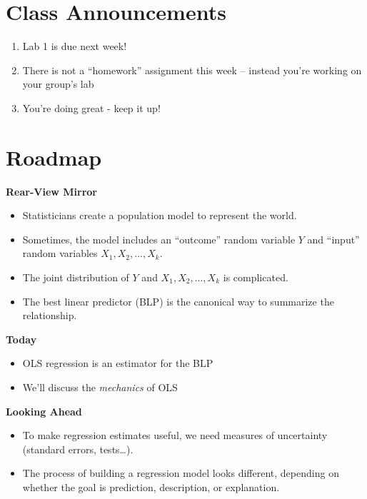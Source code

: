 \documentclass[
  letterpaper,
  DIV=11,
  numbers=noendperiod]{scrreprt}
\providecommand{\tightlist}{%
  \setlength{\itemsep}{0pt}\setlength{\parskip}{0pt}}\usepackage{longtable,booktabs,array}
\begin{document}
\section{Class Announcements}\label{class-announcements-6}

\begin{enumerate}
\def\labelenumi{\arabic{enumi}.}
\tightlist
\item
  Lab 1 is due next week!
\item
  There is not a ``homework'' assignment this week -- instead you're
  working on your group's lab
\item
  You're doing great - keep it up!
\end{enumerate}

\section{Roadmap}\label{roadmap-4}

\textbf{Rear-View Mirror}

\begin{itemize}
\tightlist
\item
  Statisticians create a population model to represent the world.
\item
  Sometimes, the model includes an ``outcome'' random variable \(Y\) and
  ``input'' random variables \(X_1, X_2,...,X_k\).
\item
  The joint distribution of \(Y\) and \(X_1, X_2,...,X_k\) is
  complicated.
\item
  The best linear predictor (BLP) is the canonical way to summarize the
  relationship.
\end{itemize}

\textbf{Today}

\begin{itemize}
\tightlist
\item
  OLS regression is an estimator for the BLP
\item
  We'll discuss the \emph{mechanics} of OLS
\end{itemize}

\textbf{Looking Ahead}

\begin{itemize}
\tightlist
\item
  To make regression estimates useful, we need measures of uncertainty
  (standard errors, tests\ldots).
\item
  The process of building a regression model looks different, depending
  on whether the goal is prediction, description, or explanation.
\end{itemize}
\end{document}
